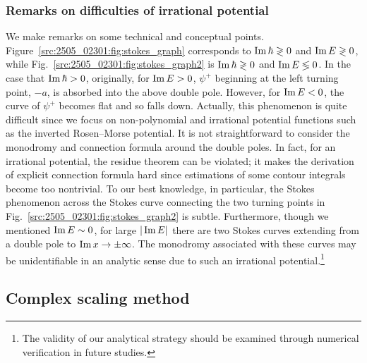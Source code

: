 \subsubsection{Remarks on difficulties of irrational potential}
We make remarks on some technical and conceptual points.
Figure~\ref{src:2505_02301:fig:stokes_graph} corresponds to $\operatorname{Im}\hbar\gtrless0$ and $\operatorname{Im} E\gtrless0$, while Fig.~\ref{src:2505_02301:fig:stokes_graph2} is $\operatorname{Im}\hbar\gtrless0$ and $\operatorname{Im} E\lessgtr0$.
In the case that $\operatorname{Im}\hbar>0$, originally, for $\operatorname{Im} E>0$, $\psi^{+}$ beginning at the left turning point, $-a$, is absorbed into the above double pole. However, for $\operatorname{Im} E<0$, the curve of $\psi^{+}$ becomes flat and so falls down.
Actually, this phenomenon is quite difficult since we focus on non-polynomial and irrational potential functions such as the inverted Rosen--Morse potential. It is not straightforward to consider the monodromy and connection formula around the double poles.
In fact, for an irrational potential, the residue theorem can be violated; it makes the derivation of explicit connection formula hard since estimations of some contour integrals become too nontrivial. To our best knowledge, in particular, the Stokes phenomenon across the Stokes curve connecting the two turning points in Fig.~\ref{src:2505_02301:fig:stokes_graph2} is subtle. Furthermore, though we mentioned $\operatorname{Im} E\sim0$, for large $|\operatorname{Im} E|$ there are two Stokes curves extending from a double pole to $\operatorname{Im} x\to\pm\infty$. The monodromy associated with these curves may be unidentifiable in an analytic sense due to such an irrational potential.\footnote{The validity of our analytical strategy should be examined through numerical verification in future studies.}
\subsection{Complex scaling method}
